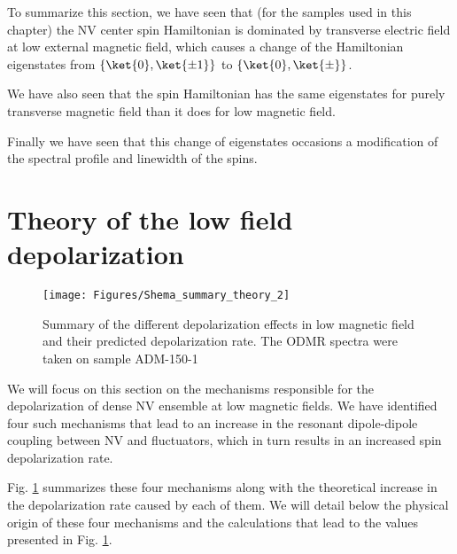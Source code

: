 \documentclass[a4paper,11pt]{report}
\begin{document}
%
%
\bigskip

To summarize this section, we have seen that (for the samples used in this chapter) the NV center spin Hamiltonian is dominated by transverse electric field at low external magnetic field, which causes a change of the Hamiltonian eigenstates from $\{ \ket{0}, \ket{\pm 1} \}$ to $\{ \ket{0}, \ket{\pm} \}$. 

We have also seen that the spin Hamiltonian has the same eigenstates for purely transverse magnetic field than it does for low magnetic field. 

Finally we have seen that this change of eigenstates occasions a modification of the spectral profile and linewidth of the spins.

\section{Theory of the low field depolarization}
\label{sec causes zero field}
\begin{figure}[h]
\centering
\texttt{[image: Figures/Shema\_summary\_theory\_2]}
\caption{Summary of the different depolarization effects in low magnetic field and their predicted depolarization rate. The ODMR spectra were taken on sample ADM-150-1}
\label{summary_theory}
\end{figure}

We will focus on this section on the mechanisms responsible for the depolarization of dense NV ensemble at low magnetic fields. We have identified four such mechanisms that lead to an increase in the resonant dipole-dipole coupling between NV and fluctuators, which in turn results in an increased spin depolarization rate.

Fig. \ref{summary_theory} summarizes these four mechanisms along with the theoretical increase in the depolarization rate caused by each of them. We will detail below the physical origin of these four mechanisms and the calculations that lead to the values presented in Fig. \ref{summary_theory}.
\end{document}
